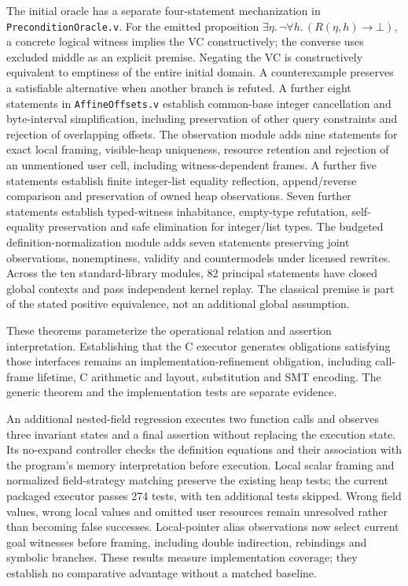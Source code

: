 The initial oracle has a separate four-statement mechanization in
\texttt{PreconditionOracle.v}. For the emitted proposition
$\exists\eta.\,\neg\forall h.\,(R(\eta,h)\rightarrow\bot)$, a concrete logical
witness implies the VC constructively; the converse uses excluded middle as
an explicit premise. Negating the VC is constructively equivalent to emptiness
of the entire initial domain. A counterexample preserves a satisfiable
alternative when another branch is refuted. A further eight statements in
\texttt{AffineOffsets.v} establish common-base integer cancellation and
byte-interval simplification, including preservation of other query constraints
and rejection of overlapping offsets. The observation module adds nine
statements for exact local framing, visible-heap uniqueness, resource retention
and rejection of an unmentioned user cell, including witness-dependent frames. A further five statements establish finite integer-list equality reflection,
append/reverse comparison and preservation of owned heap observations.
Seven further statements establish typed-witness inhabitance, empty-type
refutation, self-equality preservation and safe elimination for integer/list
types. The budgeted definition-normalization module adds seven statements preserving
joint observations, nonemptiness, validity and countermodels under licensed
rewrites. Across the ten standard-library modules, 82 principal statements have closed global contexts and pass
independent kernel replay. The classical premise is part of the stated
positive equivalence, not an additional global assumption.

These theorems parameterize the operational relation and assertion
interpretation. Establishing that the C executor generates obligations satisfying
those interfaces remains an implementation-refinement obligation, including
call-frame lifetime, C arithmetic and layout, substitution and SMT encoding.
The generic theorem and the implementation tests are separate evidence.

An additional nested-field regression executes two function calls and observes
three invariant states and a final assertion without replacing the execution
state. Its no-expand controller checks the definition equations and their
association with the program's memory interpretation before execution.
Local scalar framing and normalized field-strategy matching preserve the
existing heap tests; the current packaged executor passes 274 tests, with ten additional
tests skipped. Wrong field values, wrong local values and omitted user resources
remain unresolved rather than becoming false successes. Local-pointer alias observations now select current goal witnesses before
framing, including double indirection, rebindings and symbolic branches. These results measure implementation
coverage; they establish no comparative advantage without a matched baseline.

